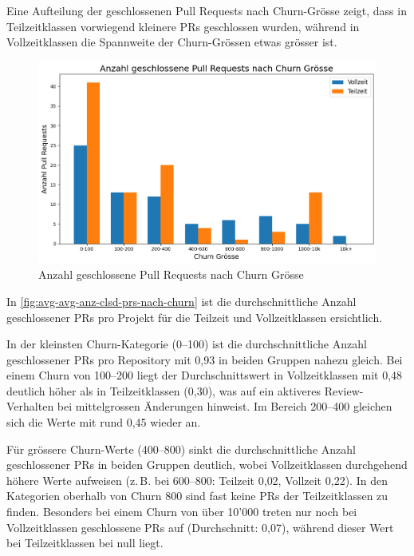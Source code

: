 Eine Aufteilung der geschlossenen Pull Requests nach Churn-Grösse zeigt, dass in Teilzeitklassen vorwiegend kleinere PRs geschlossen wurden, während in Vollzeitklassen die Spannweite der Churn-Grössen etwas grösser ist.

\begin{figure}[htbp]
    \includegraphics[width=\textwidth]{Figures/anzahl-geschlossene-prs-nach-churn.png}
    \caption{Anzahl geschlossene Pull Requests nach Churn Grösse}
    \label{fig:anz-clsd-prs-nach-churn}
\end{figure}

In \autoref{fig:avg-avg-anz-clsd-prs-nach-churn} ist die durchschnittliche Anzahl geschlossener PRs pro Projekt für die Teilzeit und Vollzeitklassen ersichtlich.

In der kleinsten Churn-Kategorie (0--100) ist die durchschnittliche Anzahl geschlossener PRs pro Repository mit 0{,}93 in beiden Gruppen nahezu gleich. Bei einem Churn von 100--200 liegt der Durchschnittswert in Vollzeitklassen mit 0{,}48 deutlich höher als in Teilzeitklassen (0{,}30), was auf ein aktiveres Review-Verhalten bei mittelgrossen Änderungen hinweist. Im Bereich 200--400 gleichen sich die Werte mit rund 0{,}45 wieder an.

Für grössere Churn-Werte (400--800) sinkt die durchschnittliche Anzahl geschlossener PRs in beiden Gruppen deutlich, wobei Vollzeitklassen durchgehend höhere Werte aufweisen (z.\,B. bei 600--800: Teilzeit 0{,}02, Vollzeit 0{,}22). In den Kategorien oberhalb von Churn 800 sind fast keine PRs der Teilzeitklassen zu finden. Besonders bei einem Churn von über 10'000 treten nur noch bei Vollzeitklassen geschlossene PRs auf (Durchschnitt: 0{,}07), während dieser Wert bei Teilzeitklassen bei null liegt.

